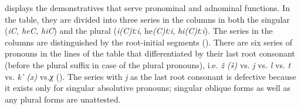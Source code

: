  displays the demonstratives that serve pronominal and adnominal functions. In the table, they are divided into three series in the columns in both the singular (\textit{iC, heC, hiC}) and the plural (\textit{i(C)tːi}, he\textit{(C)tːi}, \textit{hi(C)tːi}). The series in the columns are distinguished by the root-initial segments (). There are six series of pronouns in the lines of the table that differentiated by their last root consonant (before the plural suffix in case of the plural pronouns), i.e. \textit{ž (š)} vs. \textit{j} vs. \textit{l} vs. \textit{t} vs. \textit{k' (x)} vs.\textit{χ} (). The series with \textit{j} as the last root consonant is defective because it exists only for singular absolutive pronouns; singular oblique forms as well as any plural forms are unattested.

